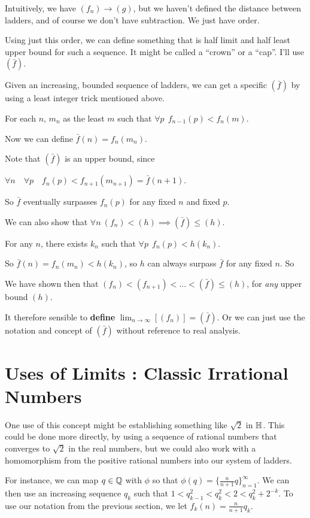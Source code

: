 \documentclass{article}
\renewcommand{\i}{\textit}
\renewcommand{\b}{\textbf}
\newcommand{\q}{\enquote}
\renewcommand{\H}{\Bbb H}
\renewcommand{\l}[1]{( #1 ) }
\begin{document}
\begin{huge}
Intuitively, we have $\l{f_n} \to \l{g}$, but we haven't defined the distance between ladders, and of course we don't have subtraction. We just have order.


Using just this order, we can define something that is half limit and half least upper bound for such a sequence. It might be called a \q{crown} or a \q{cap}. I'll use $\l{\bar f}$.

Given an increasing, bounded sequence of ladders, we can get a specific $\l{\bar f}$ by using a least integer trick mentioned above. 

For each $n$,  $m_n$ as the least $m$ such that $\forall p \ \ f_{n-1}(p) < f_n(m)$. 

Now we can define $\bar f(n) = f_n(m_n)$. 

Note that $\l{\bar f}$ is an upper bound, since 

$\forall n \quad \forall p \quad f_n(p) < f_{n+1}(m_{n+1}) = \bar f(n+1)$.

So $\bar f$ eventually surpasses $f_n(p)$ for any fixed $n$ and fixed $p$.

We can also show that $\forall n \ \l{f_n} < \l{h} \implies \l{\bar f} \le \l{h}$.

For any $n$, there exists $k_n$ such that $\forall p \ \ f_n(p) < h(k_n)$. 

So $ \bar f(n) = f_n(m_n) < h(k_n)$, so $h$ can always surpass $\bar f$ for any fixed $n$.  So 

We have shown then that $\l{f_n}  < \l{f_{n+1}}  <  ... < \l{\bar f} \le \l{h}$, for \i{any} upper bound $\l{h}$.   


It therefore sensible to \b{define} $\lim_{n \to \infty} [ \l{f_n} ]  =  \l{\bar f}$. Or we can just use the notation and concept of $\l{\bar f}$ without reference to real analysis. 

\section{Uses of Limits : Classic Irrational Numbers}
One use of this concept might be establishing something like $\sqrt{2}$ in $\H$. This could be done more directly, by using a sequence of rational numbers that converges to $\sqrt{2}$ in the real numbers, but we could also work with a homomorphism from the positive rational numbers into our system of ladders. 

For instance, we can map $q \in \Bbb Q$ with $\phi$ so that $\phi(q) = \{\frac{n}{n+1}q\}_{n=1}^{\infty}$. We can then use an increasing sequence $q_k$ such that $1 < q_{k-1}^2 < q_k^2 < 2 < q_k^2 + 2^{-k}$. To use our notation from the previous section, we let $f_k(n) = \frac{n}{n+1}q_k$. 


\end{huge}
\end{document}

